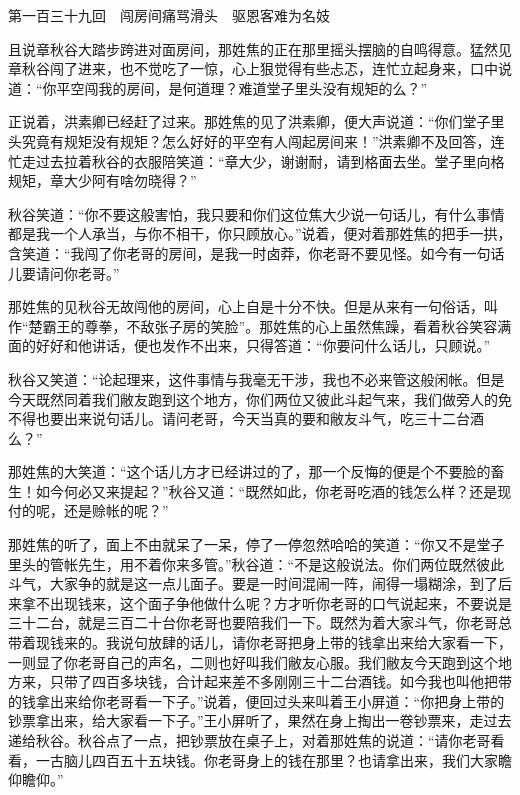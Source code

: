 \documentclass[12pt,UTF8]{ctexbook}
\begin{document}
{{{第一百三十九回　闯房间痛骂滑头　驱恩客难为名妓





且说章秋谷大踏步跨进对面房间，那姓焦的正在那里摇头摆脑的自鸣得意。猛然见章秋谷闯了进来，也不觉吃了一惊，心上狠觉得有些忐忑，连忙立起身来，口中说道：“你平空闯我的房间，是何道理？难道堂子里头没有规矩的么？”

正说着，洪素卿已经赶了过来。那姓焦的见了洪素卿，便大声说道：“你们堂子里头究竟有规矩没有规矩？怎么好好的平空有人闯起房间来！”洪素卿不及回答，连忙走过去拉着秋谷的衣服陪笑道：“章大少，谢谢耐，请到格面去坐。堂子里向格规矩，章大少阿有啥勿晓得？”

秋谷笑道：“你不要这般害怕，我只要和你们这位焦大少说一句话儿，有什么事情都是我一个人承当，与你不相干，你只顾放心。”说着，便对着那姓焦的把手一拱，含笑道：“我闯了你老哥的房间，是我一时卤莽，你老哥不要见怪。如今有一句话儿要请问你老哥。”

那姓焦的见秋谷无故闯他的房间，心上自是十分不快。但是从来有一句俗话，叫作“楚霸王的尊拳，不敌张子房的笑脸”。那姓焦的心上虽然焦躁，看着秋谷笑容满面的好好和他讲话，便也发作不出来，只得答道：“你要问什么话儿，只顾说。”

秋谷又笑道：“论起理来，这件事情与我毫无干涉，我也不必来管这般闲帐。但是今天既然同着我们敝友跑到这个地方，你们两位又彼此斗起气来，我们做旁人的免不得也要出来说句话儿。请问老哥，今天当真的要和敝友斗气，吃三十二台酒么？”

那姓焦的大笑道：“这个话儿方才已经讲过的了，那一个反悔的便是个不要脸的畜生！如今何必又来提起？”秋谷又道：“既然如此，你老哥吃酒的钱怎么样？还是现付的呢，还是赊帐的呢？”

那姓焦的听了，面上不由就呆了一呆，停了一停忽然哈哈的笑道：“你又不是堂子里头的管帐先生，用不着你来多管。”秋谷道：“不是这般说法。你们两位既然彼此斗气，大家争的就是这一点儿面子。要是一时间混闹一阵，闹得一塌糊涂，到了后来拿不出现钱来，这个面子争他做什么呢？方才听你老哥的口气说起来，不要说是三十二台，就是三百二十台你老哥也要陪我们一下。既然为着大家斗气，你老哥总带着现钱来的。我说句放肆的话儿，请你老哥把身上带的钱拿出来给大家看一下，一则显了你老哥自己的声名，二则也好叫我们敝友心服。我们敝友今天跑到这个地方来，只带了四百多块钱，合计起来差不多刚刚三十二台酒钱。如今我也叫他把带的钱拿出来给你老哥看一下子。”说着，便回过头来叫着王小屏道：“你把身上带的钞票拿出来，给大家看一下子。”王小屏听了，果然在身上掏出一卷钞票来，走过去递给秋谷。秋谷点了一点，把钞票放在桌子上，对着那姓焦的说道：“请你老哥看看，一古脑儿四百五十五块钱。你老哥身上的钱在那里？也请拿出来，我们大家瞻仰瞻仰。”

}}}
\end{document}
